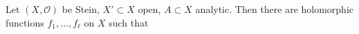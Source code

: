 Let $(X, \mathcal{O})$ be Stein, $X' \subset X$ open, $A \subset X$ analytic. Then there are holomorphic functions $f_1, \ldots, f_\ell$ on $X$ such that

